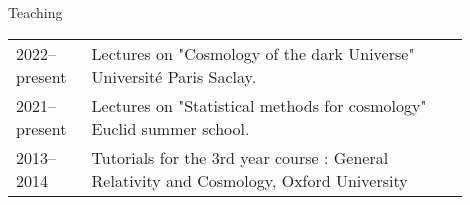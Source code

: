 \documentclass{resume} %
\begin{document}
\begin{rSection}{Teaching}
\begin{table}[h]
{\def\arraystretch{1.5}\tabcolsep=0pt
\begin{tabular}{p{0.15\linewidth}p{0.75\linewidth}}
2022--present &   Lectures on "Cosmology of the dark Universe"  Université Paris Saclay. \\
2021--present &   Lectures on "Statistical methods for cosmology"  Euclid summer school. \\
2013--2014 &  Tutorials for the 3rd year course : General Relativity and Cosmology, Oxford University 
\end{tabular}%
}
\end{table}
\end{rSection}
\vspace{-0.6cm}
\end{document}
